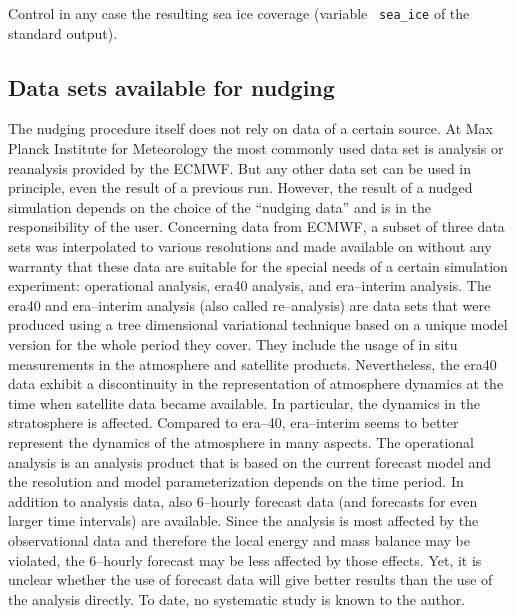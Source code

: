 \begin{appendix}
Control in any case the resulting sea ice coverage (variable {\tt
  sea\_ice} of the standard output).


\subsection{Data sets available for nudging}

The nudging procedure itself does not rely on data of a certain
source. At Max Planck Institute for Meteorology the most commonly used
data set is analysis or reanalysis provided by the ECMWF. But any
other data set can be used in principle, even the result of a previous
\echam{} run. However, the result of a nudged simulation depends on
the choice of the 
``nudging data'' and is in the responsibility of the user. Concerning
data from ECMWF, a subset of three data sets was interpolated to
various resolutions and made available on  without any warranty that these 
data are suitable for the special needs of a certain simulation
experiment: operational analysis, era40 analysis, and era--interim
analysis. The era40 and era--interim analysis (also called
re--analysis) are data sets that were produced using a tree
dimensional variational technique based on a unique model version for
the whole period they cover. They include the usage of in situ
measurements in the atmosphere and satellite products. 
Nevertheless, the era40 data exhibit a discontinuity in the representation
of atmosphere dynamics at the time when satellite data became
available. In particular, the dynamics in the stratosphere is
affected. Compared to era--40, era--interim seems to better represent the
dynamics of the atmosphere in many aspects. The
operational analysis is 
an analysis product that is based on the current forecast model and
the resolution and model parameterization depends on the time period. 
In addition to analysis data, also 6--hourly  forecast data (and
forecasts for even larger time intervals) are
available. Since the analysis is most affected by the observational
data and therefore the local energy and mass balance may be violated,
the 6--hourly forecast may be less affected by those effects. Yet, it
is unclear whether the use of forecast data will give better results
than the use of the analysis directly. To date, no systematic study is
known to the author. 


\end{appendix}
